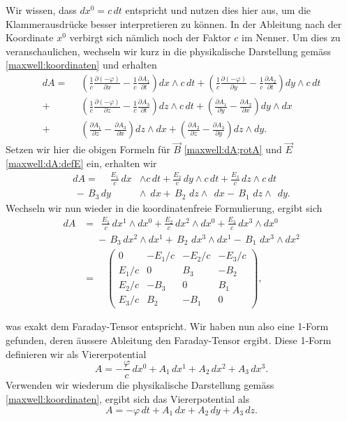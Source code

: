 Wir wissen, dass $dx^0 = c\,dt$ entspricht und nutzen dies hier aus, um die Klammerausdrücke besser interpretieren zu können.
In der Ableitung nach der Koordinate $x^0$ verbirgt sich nämlich noch der Faktor $c$ im Nenner.
Um dies zu veranschaulichen, wechseln wir kurz in die physikalische Darstellung gemäss \eqref{maxwell:koordinaten} und erhalten
\begin{align*}
	dA = \phantom{\frac{1}{c}}
	& \left(\frac{1}{c}\frac{\partial (-\varphi)}{\partial x}-\frac{1}{c}\frac{\partial A_1}{\partial t}\right) dx \wedge c\,dt 
	+ \left(\frac{1}{c}\frac{\partial (-\varphi)}{\partial y}-\frac{1}{c}\frac{\partial A_2}{\partial t}\right) dy \wedge c\,dt 
	\\
	+ &\left(\frac{1}{c}\frac{\partial (-\varphi)}{\partial z}-\frac{1}{c}\frac{\partial A_3}{\partial t}\right) dz \wedge c\,dt
	+ \left(\frac{\partial A_1}{\partial y}-\frac{\partial A_2}{\partial x}\right) dy \wedge dx 
	\\
	+ &\left(\frac{\partial A_1}{\partial z}-\frac{\partial A_3}{\partial x}\right) dz \wedge dx 
	+ \left(\frac{\partial A_2}{\partial z}-\frac{\partial A_3}{\partial y}\right) dz \wedge dy.
\end{align*}
Setzen wir hier die obigen Formeln für $\vec{B}$ \eqref{maxwell:dA;rotA} und $\vec{E}$ \eqref{maxwell:dA:defE} ein, erhalten wir
\begin{align*}
	dA = \phantom{+}
	\frac{E_1}{c} \,dx &\wedge c\,dt +
	\frac{E_2}{c} \,dy \wedge c\,dt +
	\frac{E_3}{c} \,dz \wedge c\,dt
	\\
	\, - \, B_3 \, dy &\wedge \phantom{c}dx +
	\, B_2 \,  \, dz \wedge \phantom{c} dx -
	\, B_1 \, \, dz \wedge \phantom{c} dy.
\end{align*}
Wechseln wir nun wieder in die koordinatenfreie Formulierung, ergibt sich
\begin{align*}
	dA &= \,\,\,
	 \frac{E_1}{c} \,dx^1 \wedge dx^0 +
	\frac{E_2}{c} \,dx^2 \wedge dx^0 +
	\frac{E_3}{c} \,dx^3 \wedge dx^0
	\\
	& \phantom{=}- \, B_3 \, dx^2 \wedge dx^1 +
	\, B_2 \, \, dx^3 \wedge dx^1 -
	\, B_1 \, \, dx^3 \wedge dx^2
	\\[2ex] 
	&= \quad 
	\begin{pmatrix}
		0 & -E_1/c & -E_2/c & -E_3/c \\ E_1/c & 0 & B_3 & -B_2 \\ E_2/c & -B_3 & 0 & B_1 \\ E_3/c & B_2 & -B_1 & 0 
	\end{pmatrix},
\end{align*}

was exakt dem Faraday-Tensor entspricht.
Wir haben nun also eine 1-Form gefunden, deren äussere Ableitung den Faraday-Tensor ergibt.
Diese 1-Form definieren wir als Viererpotential
\begin{equation}
	A = -\frac{\varphi}{c}\,dx^0 + A_1 \,dx^1 + A_2 \,dx^2 + A_3 \,dx^3.
\end{equation}
Verwenden wir wiederum die physikalische Darstellung gemäss \eqref{maxwell:koordinaten},
ergibt sich das Viererpotential als
\begin{equation}
	A = -\varphi\,dt + A_1 \,dx + A_2 \,dy + A_3 \,dz.
\end{equation}